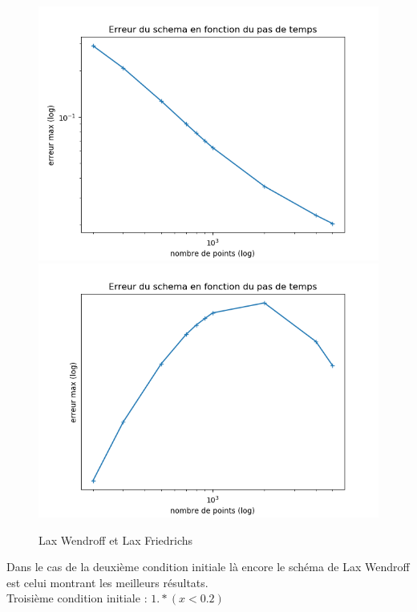 \documentclass[12pt]{article}
\begin{document}
\begin{figure}[H]
	\centering
	\includegraphics[scale=0.40]{erreur_schema3_init2.png}
	\includegraphics[scale=0.40]{erreur_schema5_init2.png}
	\caption{Lax Wendroff et Lax Friedrichs}
	\label{1D}
	\end{figure}
Dans le cas de la deuxième condition initiale là encore le schéma de Lax Wendroff est celui montrant les meilleurs résultats.
\\Troisième condition initiale : $1.*(x<0.2)$
\end{document}
